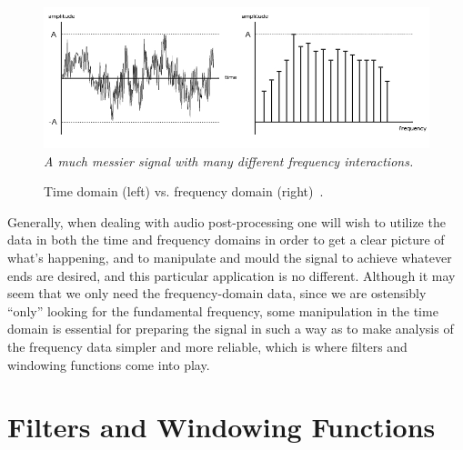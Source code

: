 \documentclass[12pt]{report}
\begin{document}
\begin{figure}[h]
	\centering
	\includegraphics[width=120mm]{timevfreq-03.jpg}
	\\ \emph{A much messier signal with many different frequency interactions.}
	\caption[Time vs. Frequency: Messy]{Time domain (left) vs. frequency domain (right)~\cite{Anon2014c}.} 
	\label{fig:tvf2} 
\end{figure}	

\indent Generally, when dealing with audio post-processing one will wish to utilize the data in both the time and frequency domains in order to get a clear picture of what's happening, and to manipulate and mould the signal to achieve whatever ends are desired, and this particular application is no different. Although it may seem that we only need the frequency-domain data, since we are ostensibly ``only'' looking for the fundamental frequency, some manipulation in the time domain is essential for preparing the signal in such a way as to make analysis of the frequency data simpler and more reliable, which is where filters and windowing functions come into play.
\clearpage

\section{Filters and Windowing Functions}
\end{document}
